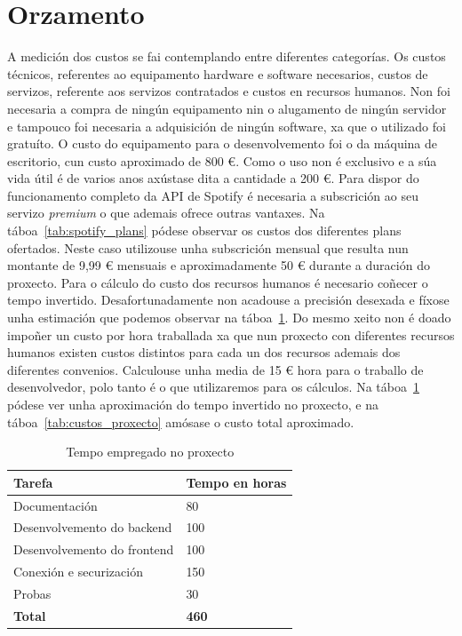 \section{Orzamento}
A medición dos custos se fai contemplando entre diferentes categorías. Os custos técnicos, referentes ao equipamento hardware e software necesarios, custos de servizos, referente aos servizos contratados e custos en recursos humanos. Non foi necesaria a compra de ningún equipamento nin o alugamento de ningún servidor e tampouco foi necesaria a adquisición de ningún software, xa que o utilizado foi gratuíto. O custo do equipamento para o desenvolvemento foi o da máquina de escritorio, cun custo aproximado de 800 €. Como o uso non é exclusivo e a súa vida útil é de varios anos axústase dita a cantidade a 200 €.\medbreak
Para dispor do funcionamento completo da API de Spotify é necesaria a subscrición ao seu servizo \textit{premium} o que ademais ofrece outras vantaxes. Na táboa~\ref{tab:spotify_plans} pódese observar os custos dos diferentes plans ofertados. Neste caso utilizouse unha subscrición mensual que resulta nun montante de 9,99 € mensuais e aproximadamente 50 € durante a duración do proxecto.\medbreak
Para o cálculo do custo dos recursos humanos é necesario coñecer o tempo invertido. Desafortunadamente non acadouse a precisión desexada e fíxose unha estimación que podemos observar na táboa~\ref{tab:custos_humanos}. Do mesmo xeito non é doado impoñer un custo por hora traballada xa que nun proxecto con diferentes recursos humanos existen custos distintos para cada un dos recursos ademais dos diferentes convenios. Calculouse unha media de 15 € hora para o traballo de desenvolvedor, polo tanto é o que utilizaremos para os cálculos.\medbreak
Na táboa~\ref{tab:custos_humanos} pódese ver unha aproximación do tempo invertido no proxecto, e na táboa~\ref{tab:custos_proxecto} amósase o custo total aproximado. 

\begin{table}[ht]
	\caption{Tempo empregado no proxecto}
	\label{tab:custos_humanos}
	\begin{center}
		\begin{tabular}{| l | l |}
			\hline
			Tarefa & Tempo en horas\\ \hline
			Documentación & 80 \\
			Desenvolvemento do backend & 100 \\
			Desenvolvemento do frontend & 100 \\
		    Conexión e securización & 150 \\
			Probas & 30\\
			{\textbf{Total}} & {\textbf{460}} \\ \hline
		\end{tabular}
	\end{center}
\end{table}

